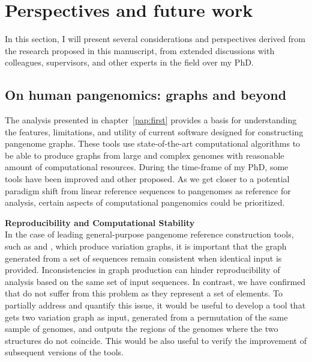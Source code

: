 
\chapter{Perspectives and future work}
\label{sec:perspectives}
In this section, I will present several considerations and perspectives derived from the research proposed in this manuscript, from extended discussions with colleagues, supervisors, and other experts in the field over my PhD.

\section{On human pangenomics: graphs and beyond}
The analysis presented in chapter~\ref{pap:first} provides a basis for understanding the features, limitations, and utility of current software designed for constructing pangenome graphs. These tools use state-of-the-art computational algorithms to be able to produce graphs from large and complex genomes with reasonable amount of computational resources. During the time-frame of my PhD, some tools have been improved and other proposed. As we get closer to a potential paradigm shift from linear reference sequences to pangenomes as reference for analysis, certain aspects of computational pangenomics could be prioritized. 


\textbf{Reproducibility and Computational Stability}\\
In the case of leading general-purpose pangenome reference construction tools, such as \pggb and \mcactus, which produce variation graphs, it is important that the graph generated from a set of sequences remain consistent when identical input is provided. Inconsistencies in graph production can hinder reproducibility of analysis based on the same set of input sequences. In contrast, we have confirmed that \dbgs do not suffer from this problem as they represent a set of elements. To partially address and quantify this issue, it would be useful to develop a tool that gets two variation graph as input, generated from a permutation of the same sample of genomes, and outputs the regions of the genomes where the two structures do not coincide. This would be also useful to verify the improvement of subsequent versions of the tools.


